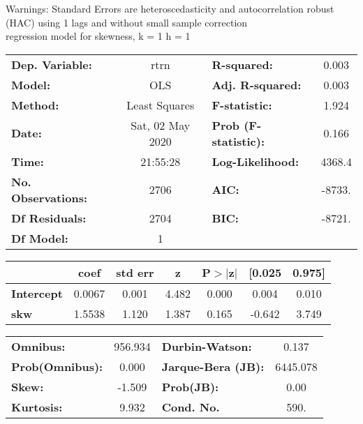 Warnings: \newline
 [1] Standard Errors are heteroscedasticity and autocorrelation robust (HAC) using 1 lags and without small sample correction\\ 

regression model for skewness, k = 1 h = 1\begin{center}
\begin{tabular}{lclc}
\toprule
\textbf{Dep. Variable:}    &       rtrn       & \textbf{  R-squared:         } &     0.003   \\
\textbf{Model:}            &       OLS        & \textbf{  Adj. R-squared:    } &     0.003   \\
\textbf{Method:}           &  Least Squares   & \textbf{  F-statistic:       } &     1.924   \\
\textbf{Date:}             & Sat, 02 May 2020 & \textbf{  Prob (F-statistic):} &    0.166    \\
\textbf{Time:}             &     21:55:28     & \textbf{  Log-Likelihood:    } &    4368.4   \\
\textbf{No. Observations:} &        2706      & \textbf{  AIC:               } &    -8733.   \\
\textbf{Df Residuals:}     &        2704      & \textbf{  BIC:               } &    -8721.   \\
\textbf{Df Model:}         &           1      & \textbf{                     } &             \\
\bottomrule
\end{tabular}
\begin{tabular}{lcccccc}
                   & \textbf{coef} & \textbf{std err} & \textbf{z} & \textbf{P$> |$z$|$} & \textbf{[0.025} & \textbf{0.975]}  \\
\midrule
\textbf{Intercept} &       0.0067  &        0.001     &     4.482  &         0.000        &        0.004    &        0.010     \\
\textbf{skw}       &       1.5538  &        1.120     &     1.387  &         0.165        &       -0.642    &        3.749     \\
\bottomrule
\end{tabular}
\begin{tabular}{lclc}
\textbf{Omnibus:}       & 956.934 & \textbf{  Durbin-Watson:     } &    0.137  \\
\textbf{Prob(Omnibus):} &   0.000 & \textbf{  Jarque-Bera (JB):  } & 6445.078  \\
\textbf{Skew:}          &  -1.509 & \textbf{  Prob(JB):          } &     0.00  \\
\textbf{Kurtosis:}      &   9.932 & \textbf{  Cond. No.          } &     590.  \\
\bottomrule
\end{tabular}
\end{center}

